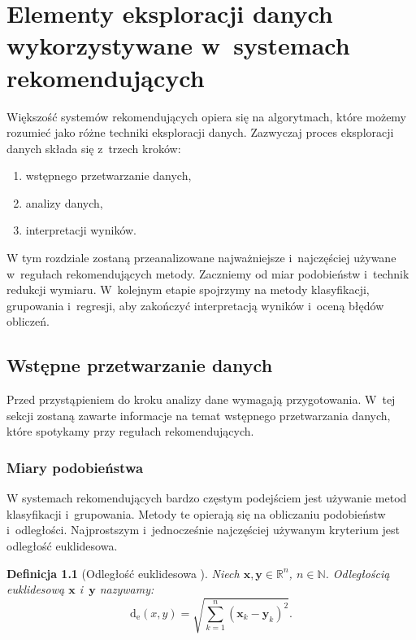 \documentclass[12pt,a4paper]{report}
\newtheorem{df}{Definicja}[chapter]
\newcommand{\setR}{\mathbb{R}}
\newcommand{\setN}{\mathbb{N}}
\newcommand{\distanceee}[2]{\operatorname{d_e}\left({#1}, {#2} \right)}
\begin{document}
\chapter{Elementy eksploracji danych wykorzystywane w~systemach rekomendujących}
Większość systemów rekomendujących opiera się na algorytmach, które możemy rozumieć jako różne techniki eksploracji danych. 
Zazwyczaj proces eksploracji danych składa się z~trzech kroków:
\begin{enumerate}
\item wstępnego przetwarzanie danych,
\item analizy danych,
\item interpretacji wyników.
\end{enumerate}
W tym rozdziale zostaną przeanalizowane najważniejsze i~najczęściej używane w~regułach rekomendujących metody. Zaczniemy od miar podobieństw i~technik redukcji wymiaru. W~kolejnym etapie spojrzymy na metody klasyfikacji, grupowania i~regresji, aby zakończyć interpretacją wyników i~oceną błędów obliczeń.

\section{Wstępne przetwarzanie danych}
Przed przystąpieniem do kroku analizy dane wymagają przygotowania. W~tej sekcji zostaną zawarte informacje na temat wstępnego przetwarzania danych, które spotykamy przy regułach rekomendujących.

\subsection{Miary podobieństwa}
W systemach rekomendujących bardzo częstym podejściem jest używanie metod klasyfikacji i~grupowania. Metody te opierają się na obliczaniu podobieństw i~odległości.
Najprostszym i~jednocześnie najczęściej używanym kryterium jest odległość euklidesowa.

\begin{df}[Odległość euklidesowa \citep{rsh}]%

Niech $\mathbf{x},\mathbf{y} \in \setR^n $, $n \in\setN$. Odległością euklidesową $\mathbf{x}$ i~$\mathbf{y}$ nazywamy:
$$
\distanceee{x}{y} = \sqrt{\sum_{k=1}^n(\mathbf{x}_k-\mathbf{y}_k)^2}.
$$
\end{df}
\end{document}
